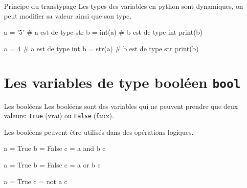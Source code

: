 \begin{easybox}{Principe du transtypage}{}
    Les types des variables en python sont dynamiques, on peut modifier sa valeur ainsi que son type.
    
    \begin{minipage}[t]{0.48\linewidth}
        \begin{ConsolePythontex}[ Label=false]{}
            a = '5'     # a est de type str
            b = int(a)  # b est de type int
            print(b)
        \end{ConsolePythontex}
    \end{minipage}\hfill
    \begin{minipage}[t]{0.48\linewidth}
        \begin{ConsolePythontex}[ Label=false]{}
            a = 4       # a est de type int
            b = str(a)  # b est de type str
            print(b)
        \end{ConsolePythontex}
    \end{minipage}
    
    \end{easybox}

    \section{Les variables de type booléen \texttt{bool}}

    
\begin{easybox}{Les booléens}{}
    \smallskip
    Les booléens sont des variables qui ne peuvent prendre que deux valeurs: \verb+True+ (vrai) ou \verb+False+ (faux).
    
    \smallskip
    Les booléens peuvent être utilisés dans des opérations logiques.
    
	\medskip

    \begin{minipage}{0.32\linewidth}
        \begin{ConsolePythontex}[ Label=false]{}
a = True
b = False
c = a and b
c
        \end{ConsolePythontex}
    \end{minipage}\hfill
    \begin{minipage}{0.32\linewidth}
        \begin{ConsolePythontex}[ Label=false]{}
a = True
b = False
c = a or b
c
        \end{ConsolePythontex}
    \end{minipage}\hfill
    \begin{minipage}{0.32\linewidth}
        \begin{ConsolePythontex}[ Label=false]{}
a = True
c = not a
c
        \end{ConsolePythontex}
    \end{minipage}    
\end{easybox}

